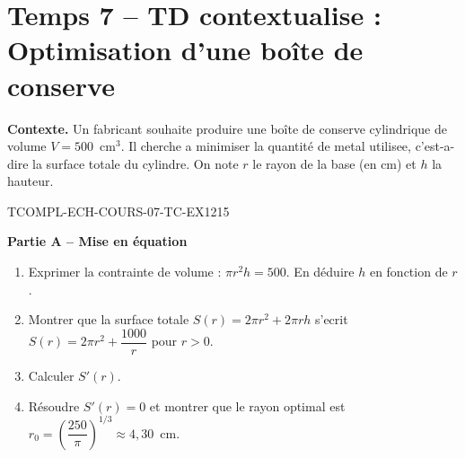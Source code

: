 

\section*{Temps 7 -- TD contextualise : Optimisation d'une boîte de conserve}

\textbf{Contexte.} Un fabricant souhaite produire une boîte de conserve cylindrique de volume $V = 500$~cm$^3$. Il cherche a minimiser la quantité de metal utilisee, c'est-a-dire la surface totale du cylindre. On note $r$ le rayon de la base (en cm) et $h$ la hauteur.

\bigskip


\begin{exercice}{TCOMPL-ECH-COURS-07-TC-EX1}{2}{15}

\textbf{Partie A -- Mise en équation}

\begin{enumerate}
  \item Exprimer la contrainte de volume : $\pi r^2 h = 500$. En déduire $h$ en fonction de $r$.
  \item Montrer que la surface totale $S(r) = 2\pi r^2 + 2\pi r h$ s'ecrit $S(r) = 2\pi r^2 + \dfrac{1000}{r}$ pour $r > 0$.
  \item Calculer $S'(r)$.
  \item Résoudre $S'(r) = 0$ et montrer que le rayon optimal est $r_0 = \left(\dfrac{250}{\pi}\right)^{1/3} \approx 4{,}30$~cm.
\end{enumerate}

\end{exercice}


